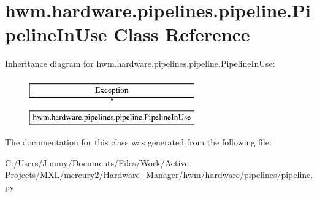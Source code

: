 \hypertarget{classhwm_1_1hardware_1_1pipelines_1_1pipeline_1_1_pipeline_in_use}{\section{hwm.\-hardware.\-pipelines.\-pipeline.\-Pipeline\-In\-Use Class Reference}
\label{classhwm_1_1hardware_1_1pipelines_1_1pipeline_1_1_pipeline_in_use}
}
Inheritance diagram for hwm.\-hardware.\-pipelines.\-pipeline.\-Pipeline\-In\-Use\-:\begin{figure}[H]
\begin{center}
\leavevmode
\includegraphics[height=2.000000cm]{classhwm_1_1hardware_1_1pipelines_1_1pipeline_1_1_pipeline_in_use}
\end{center}
\end{figure}


The documentation for this class was generated from the following file\-:\begin{DoxyCompactItemize}
\item 
C\-:/\-Users/\-Jimmy/\-Documents/\-Files/\-Work/\-Active Projects/\-M\-X\-L/mercury2/\-Hardware\-\_\-\-Manager/hwm/hardware/pipelines/pipeline.\-py\end{DoxyCompactItemize}
